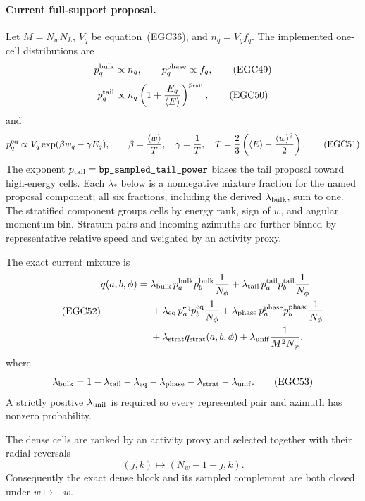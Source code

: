 \paragraph{Current full-support proposal.}
Let \(M=N_wN_L\), \(V_q\) be equation~(EGC36), and
\(n_q=V_qf_q\).  The implemented one-cell distributions are
\[
 p_q^{\rm bulk}\propto n_q,\qquad
 p_q^{\rm phase}\propto f_q,                             \tag{EGC49}
\]
\[
 p_q^{\rm tail}\propto
 n_q\left(1+\frac{E_q}{\langle E\rangle}\right)^{p_{\rm tail}},
                                                               \tag{EGC50}
\]
and
\[
 p_q^{\rm eq}\propto
 V_q\exp(\beta w_q-\gamma E_q),\qquad
 \beta=\frac{\langle w\rangle}{T},\quad
 \gamma=\frac1T,\quad
 T=\frac23\left(\langle E\rangle-\frac{\langle w\rangle^2}{2}\right).
                                                               \tag{EGC51}
\]
The exponent \(p_{\rm tail}=\code{bp_sampled_tail_power}\) biases the tail
proposal toward high-energy cells.  Each \(\lambda_*\) below is a
nonnegative mixture fraction for the named proposal component; all six
fractions, including the derived \(\lambda_{\rm bulk}\), sum to one.
The stratified component groups cells by energy rank, sign of \(w\), and
angular momentum bin.  Stratum pairs and incoming azimuths are further binned
by representative relative speed and weighted by an activity proxy.

The exact current mixture is
\begin{equation}
\tag{EGC52}
\begin{split}
 q(a,b,\phi)={}&
 \lambda_{\rm bulk}\,
 p_a^{\rm bulk}p_b^{\rm bulk}\frac1{N_\phi}
 +\lambda_{\rm tail}\,
 p_a^{\rm tail}p_b^{\rm tail}\frac1{N_\phi}\\
 &+\lambda_{\rm eq}\,
 p_a^{\rm eq}p_b^{\rm eq}\frac1{N_\phi}
 +\lambda_{\rm phase}\,
 p_a^{\rm phase}p_b^{\rm phase}\frac1{N_\phi}\\
 &+\lambda_{\rm strat}q_{\rm strat}(a,b,\phi)
 +\lambda_{\rm unif}\frac1{M^2N_\phi}.
\end{split}
\end{equation}
where
\[
 \lambda_{\rm bulk}
 =
 1-\lambda_{\rm tail}-\lambda_{\rm eq}
  -\lambda_{\rm phase}-\lambda_{\rm strat}
  -\lambda_{\rm unif}.                                  \tag{EGC53}
\]
A strictly positive \(\lambda_{\rm unif}\) is required so every represented
pair and azimuth has nonzero probability.

The dense cells are ranked by an activity proxy and selected together with
their radial reversals
\[
 (j,k)\longmapsto(N_w-1-j,k).                            \tag{EGC54}
\]
Consequently the exact dense block and its sampled complement are both closed
under \(w\mapsto-w\).


